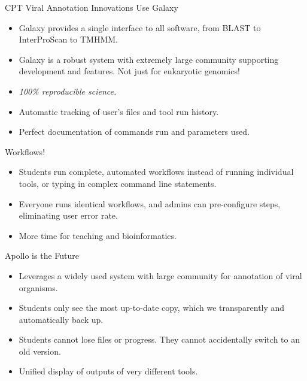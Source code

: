\documentclass[final,t]{beamer}
\begin{document}
\begin{frame}[fragile]
\begin{columns}[t]
\begin{column}{.36\linewidth}
            \begin{block}{CPT Viral Annotation Innovations}
                Use Galaxy
                \begin{itemize}
                    \item Galaxy provides a single interface to all software,
                        from BLAST to InterProScan to TMHMM.
                    \item Galaxy is a robust system with extremely large community
                        supporting development and features. Not just for eukaryotic genomics!
                    \item \emph{100\% reproducible science.}
                    \item Automatic tracking of user's files and tool run history.
                    \item Perfect documentation of commands run and parameters used.
                \end{itemize}
                Workflows!
                \begin{itemize}
                    \item Students run complete, automated workflows instead of
                        running individual tools, or typing in complex command
                        line statements.
                    \item Everyone runs identical workflows, and admins can
                        pre-configure steps, eliminating user error rate.
                    \item More time for teaching and bioinformatics.
                \end{itemize}
                Apollo is the Future
                \begin{itemize}
                    \item Leverages a widely used system with large community
                        for annotation of viral organisms.
                    \item Students only see the most up-to-date copy, which we
                        transparently and automatically back up.
                    \item Students cannot lose files or progress. They cannot
                        accidentally switch to an old version.
                    \item Unified display of outputs of very different tools.
                \end{itemize}
            \end{block}


\end{column}
\end{columns}
\end{frame}
\end{document}
